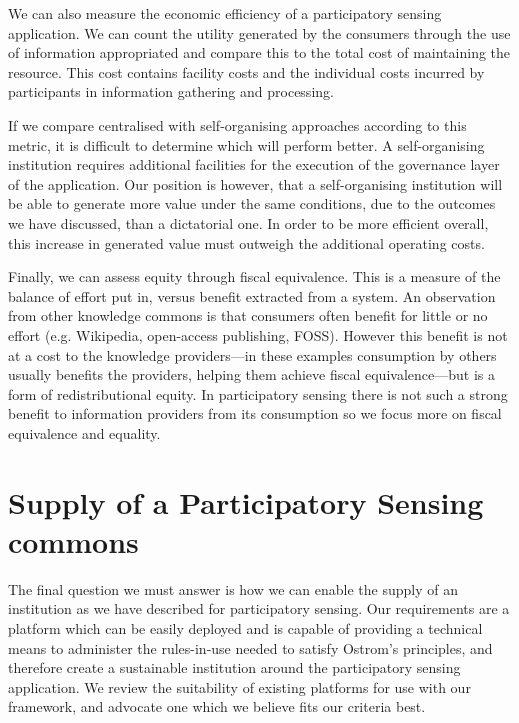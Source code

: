 We can also measure the economic efficiency of a participatory sensing application. We can count the utility generated by the consumers through the use of information appropriated and compare this to the total cost of maintaining the resource. This cost contains facility costs and the individual costs incurred by participants in information gathering and processing.

If we compare centralised with self-organising approaches according to this metric, it is difficult to determine which will perform better. 
A self-organising institution requires additional facilities for the execution of the governance layer of the application. 
Our position is however, that a self-organising institution will be able to generate more value under the same conditions, due to the outcomes we have discussed, than a dictatorial one. 
In order to be more efficient overall, this increase in generated value must outweigh the additional operating costs.

Finally, we can assess equity through fiscal equivalence. 
This is a measure of the balance of effort put in, versus benefit extracted from a system. 
An observation from other knowledge commons is that consumers often benefit for little or no effort (e.g. Wikipedia, open-access publishing, FOSS). However this benefit is not at a cost to the knowledge providers---in these examples consumption by others usually benefits the providers, helping them achieve fiscal equivalence---but is a form of redistributional equity. In participatory sensing there is not such a strong benefit to information providers from its consumption so we focus more on fiscal equivalence and equality.

\section{Supply of a Participatory Sensing commons}

The final question we must answer is how we can enable the supply of an institution as we have described for participatory sensing. 
Our requirements are a platform which can be easily deployed and is capable of providing a technical means to administer the rules-in-use needed to satisfy Ostrom's principles, and therefore create a sustainable institution around the participatory sensing application. 
We review the suitability of existing platforms for use with our framework, and advocate one which we believe fits our criteria best.


